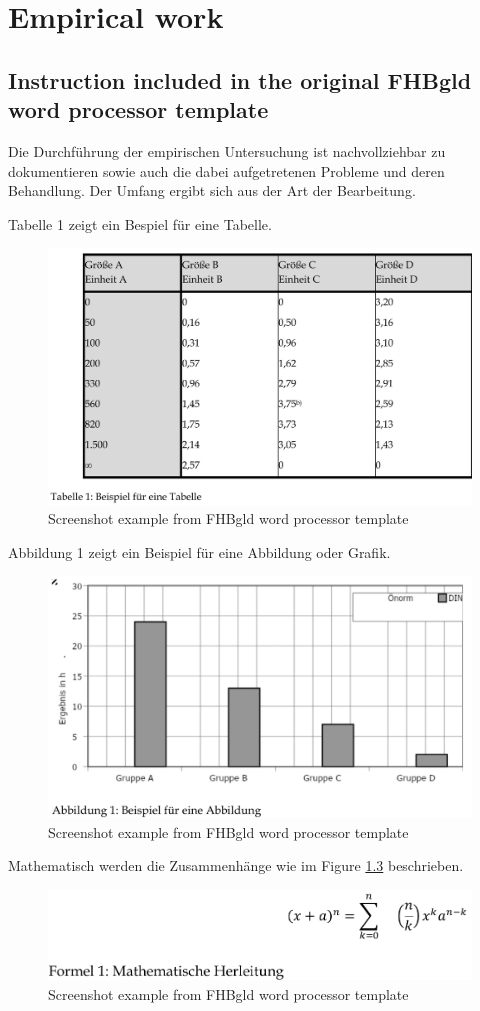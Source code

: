 \chapter{Empirical work}

\section{Instruction included in the original FHBgld word processor template}
Die Durchführung der empirischen Untersuchung ist nachvollziehbar zu dokumentieren sowie auch die dabei aufgetretenen Probleme und deren Behandlung. Der Umfang ergibt sich aus der Art der Bearbeitung.  

Tabelle 1 zeigt ein Bespiel für eine Tabelle. 

\begin{figure}[ht]
	\centering
	\includegraphics[width=0.7\linewidth]{figures/Word_Table}
	\caption{Screenshot example from FHBgld word processor template}
	\label{fig:wordtable}
\end{figure}
Abbildung 1 zeigt ein Beispiel für eine Abbildung oder Grafik.
\begin{figure}
	\centering
	\includegraphics[width=0.7\linewidth]{figures/Word_Diagram}
	\caption{Screenshot example from FHBgld word processor template}
	\label{fig:worddiagram}
\end{figure}
\linebreak
Mathematisch werden die Zusammenhänge wie im Figure \ref{fig:wordformel} beschrieben.
\begin{figure}
	\centering
	\includegraphics[width=0.7\linewidth]{figures/Word_Formel}
	\caption{Screenshot example from FHBgld word processor template}
	\label{fig:wordformel}
\end{figure}

